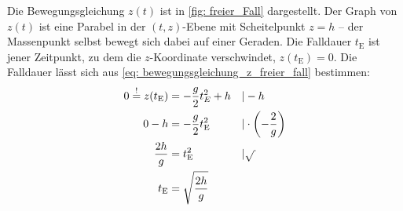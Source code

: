 Die Bewegungsgleichung $z(t)$ ist in \cref{fig: freier_Fall} dargestellt. Der Graph von $z(t)$ ist eine Parabel in der $(t,z)$-Ebene mit Scheitelpunkt $z=h$ -- der Massenpunkt selbst bewegt sich dabei auf einer Geraden. Die Falldauer $t_\mathrm{E}$ ist jener Zeitpunkt, zu dem die $z$-Koordinate verschwindet, \gDh $z(t_\mathrm{E}) = 0$. Die Falldauer lässt sich aus \cref{eq: bewegungsgleichung_z_freier_fall} bestimmen:
\begin{align}
  0 \stackrel{!}{=} z(t_\mathrm{E}) &= -\frac{g}{2}t_E^2 + h & &| -h \notag \\
  0-h &= -\frac{g}{2}t_\mathrm{E}^2 & &| \cdot \left(-\frac{2}{g}\right) \notag \\
  \frac{2h}{g} &= t_\mathrm{E}^2 & &| \sqrt{\text{\,}} \notag \\
  t_\mathrm{E} &= \sqrt{\frac{2h}{g}} \label{eq: fallzeit_freier_fall}
\end{align}

